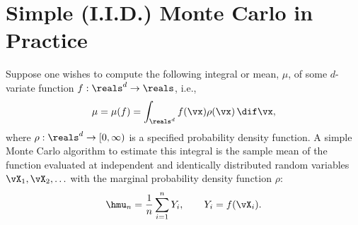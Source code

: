 \documentclass[graybox]{svmult}
\begin{document}
\section{Simple (I.I.D.) Monte Carlo in Practice}

Suppose one wishes to compute the following integral or mean, $\mu$, of some $d$-variate function $f: \reals^d \to \reals$, i.e.,
\begin{equation*} 
\mu= \mu(f) = \int_{\reals^d} f(\vx) \rho(\vx) \, \dif \vx,
\end{equation*}
where $\rho: \reals^d \to [0,\infty)$ is a specified probability density function.  A simple Monte Carlo algorithm to estimate this integral is the sample mean of the function evaluated at independent and identically distributed random variables $\vX_1, \vX_2, \ldots$ with the marginal probability density function $\rho$:
\begin{equation} \label{samplemean}
\hmu_n = \frac 1n \sum_{i=1}^n Y_i, \qquad Y_i = f(\vX_i).
\end{equation}
\end{document}
